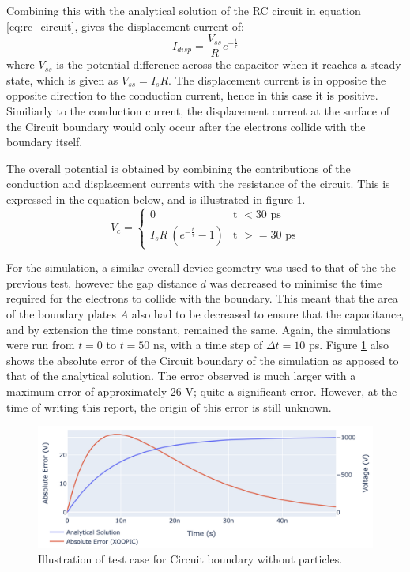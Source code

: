 Combining this with the analytical solution of the RC circuit in equation \ref{eq:rc_circuit}, gives the displacement current of:
\begin{equation}
	I_{disp} = \frac{V_{ss}}{R}e^{-\frac{t}{\tau}}
\end{equation}
where $V_{ss}$ is the potential difference across the capacitor when it reaches a steady state, which is given as $V_{ss} = I_s R$. The displacement current is in opposite the opposite direction to the conduction current, hence in this case it is positive. Similiarly to the conduction current, the displacement current at the surface of the Circuit boundary would only occur after the electrons collide with the boundary itself. 

The overall potential is obtained by combining the contributions of the conduction and displacement currents with the resistance of the circuit. This is expressed in the equation below, and is illustrated in figure \ref{fig:test_2_error}.
\begin{equation}
	V_c = 
	\begin{cases}
		0 								  &\text{t $< 30$ ps} \\
		I_s R\ (e^{-\frac{t}{\tau}} - 1) &\text{t $>= 30$ ps}
	\end{cases}
\end{equation}

For the simulation, a similar overall device geometry was used to that of the the previous test, however the gap distance $d$ was decreased to minimise the time required for the electrons to collide with the boundary. This meant that the area of the boundary plates $A$ also had to be decreased to ensure that the capacitance, and by extension the time constant, remained the same. Again, the simulations were run from $t=0$ to $t=50$ ns, with a time step of $\Delta t = 10$ ps. Figure \ref{fig:test_2_error} also shows the absolute error of the Circuit boundary of the simulation as apposed to that of the analytical solution. The error observed is much larger with a maximum error of approximately 26 V; quite a significant error. However, at the time of writing this report, the origin of this error is still unknown.

\begin{figure}[h!]
	\centering
	\includegraphics[width=\linewidth]{xoopic/figures/test_2_error.png}
	\caption{Illustration of test case for Circuit boundary without particles.}
	\label{fig:test_2_error}
\end{figure} 

